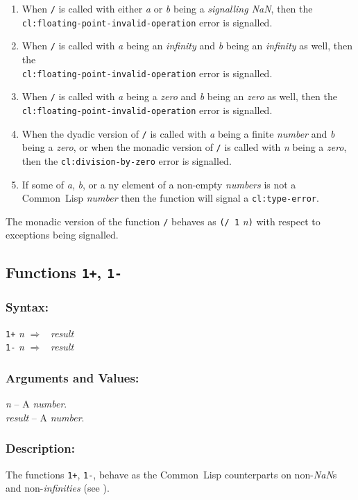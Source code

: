 \documentclass[10pt,fleqn]{article}
\newcommand{\CL}{\textsf{Common~Lisp}}
\newcommand{\code}[1]{\texttt{#1}}
\newcommand{\clieeeterm}[1]{\textit{#1}}
\newcommand{\varname}[1]{\textit{#1}}
\newcommand{\clterm}[1]{\textit{#1}}
\newcommand{\clname}[1]{\texttt{#1}}
\newcommand{\RArrow}{$\Rightarrow$}
\newcommand{\DDictionaryItem}[1]{\vspace*{6pt}\noindent\hrulefill\vspace*{-9pt}\subsection*{#1}}
\newcommand{\DSyntax}{\subsubsection*{Syntax:}}
\newcommand{\DArgsNValues}{\subsubsection*{Arguments and Values:}}
\newcommand{\DDescription}{\subsubsection*{Description:}}
\begin{document}
\begin{enumerate}
\item When \code{/} is called with either \varname{a} or \varname{b}
  being a \emph{signalling NaN}, then the\\
  \clname{cl:floating-point-invalid-operation} error is signalled.

\item When \code{/} is called with \varname{a} being an 
  \clieeeterm{infinity} and \varname{b} being an 
  \clieeeterm{infinity} as well, then the\\
  \clname{cl:floating-point-invalid-operation} error is signalled.

\item When \code{/} is called with \varname{a} being a
  \clieeeterm{zero} and \varname{b} being an 
  \clieeeterm{zero} as well, then the\\
  \clname{cl:floating-point-invalid-operation} error is signalled.

\item When the dyadic version of \code{/} is called with \varname{a}
  being a finite \clterm{number} and \varname{b} being a
  \clieeeterm{zero}, or when the monadic version of \code{/} is called
  with \varname{n} being a \clieeeterm{zero}, then the
  \clname{cl:division-by-zero} error is signalled.

\item If some of \varname{a}, \varname{b}, or a
  ny element of a non-empty
  \varname{numbers} is not a \CL{} \clterm{number} then the function
  will signal a \clname{cl:type-error}.
\end{enumerate}

\noindent
The monadic version of the function \code {/} behaves as \code{(/ 1}
\varname{n}\code{)} with respect to exceptions being signalled.


\DDictionaryItem{Functions \code{1+}, \code{1-}}

\DSyntax{}

\code{1+} \varname{n} \RArrow ~ \varname{result}\\
\code{1-} \varname{n} \RArrow ~ \varname{result}\\

\DArgsNValues{}

\varname{n} -- A \clterm{number}.\\
\varname{result} -- A \clterm{number}.


\DDescription{}

The functions \code{1+}, \code{1-}, behave
as the \CL{} counterparts on non-\clieeeterm{NaN}s and
non-\clieeeterm{infinities} (see \cite{1996:ANSIHyperSpec}).
\end{document}
